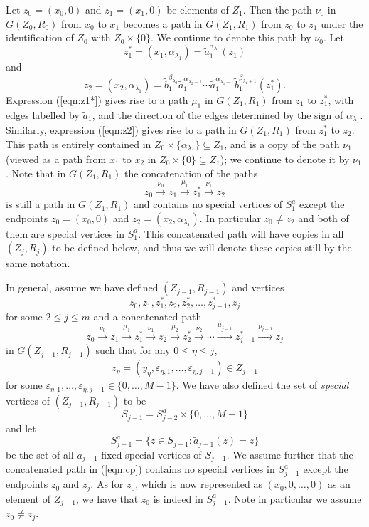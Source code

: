 \documentclass[10pt,a4paper]{amsart}
\theoremstyle{definition}
\theoremstyle{definition}
\numberwithin{equation}{section}
\begin{document}
Let $z_0=(x_0,0)$ and $z_1=(x_1,0)$ be elements of $Z_1$. Then the path $\nu_0$ in $G(Z_0,R_0)$ from $x_0$ to $x_1$ becomes a path in $G(Z_1, R_1)$ from $z_0$ to $z_1$ under the identification of $Z_0$ with $Z_0\times\{0\}$. We continue to denote this path by $\nu_0$. Let 
\begin{equation}\label{eqn:z1*} z_1^*=(x_1,\alpha_{\lambda_1})=\tilde{a}_1^{\alpha_{\lambda_1}}(z_1) \end{equation}
and
\begin{equation}\label{eqn:z2} z_2=(x_2, \alpha_{\lambda_1})=\tilde{b}_1^{\beta_{\lambda_2}}\tilde{a}_1^{\alpha_{\lambda_2-1}}\cdots\tilde{a}_1^{\alpha_{\lambda_1+1}}\tilde{b}_1^{\beta_{\lambda_1+1}}(z_1^*). \end{equation}
Expression (\ref{eqn:z1*}) gives rise to a path $\mu_1$ in $G(Z_1, R_1)$ from $z_1$ to $z_1^*$, with edges labelled by $\tilde{a}_1$, and the direction of the edges determined by the sign of $\alpha_{\lambda_1}$. Similarly, expression (\ref{eqn:z2}) gives rise to a path in $G(Z_1, R_1)$ from $z_1^*$ to $z_2$. This path is entirely contained in $Z_0\times \{\alpha_{\lambda_1}\}\subseteq Z_1$, and is a copy of the path $\nu_1$ (viewed as a path from $x_1$ to $x_2$ in $Z_0\times\{0\}\subseteq Z_1$); we continue to denote it by $\nu_1$. Note that in $G(Z_1, R_1)$ the concatenation of the paths
$$ z_0\stackrel{\nu_0}{\longrightarrow} z_1\stackrel{\mu_1}{\longrightarrow}z_1^*\stackrel{\nu_1}{\longrightarrow}z_2 $$
is still a path in $G(Z_1, R_1)$ and contains no special vertices of $S_1^a$ except the endpoints $z_0=(x_0, 0)$ and $z_2=(x_2, \alpha_{\lambda_1})$. In particular $z_0\neq z_2$ and both of them are special vertices in $S_1^a$. This concatenated path will have copies in all $(Z_j, R_j)$ to be defined below, and thus we will denote these copies still by the same notation.

In general, assume we have defined $(Z_{j-1}, R_{j-1})$ and vertices $$z_0, z_1, z_1^*, z_2, z_2^*, \dots, z_{j-1}^*, z_{j}$$ for some $2\leq j\leq m$ and a concatenated path
\begin{equation}\label{eqn:cp} z_0\stackrel{\nu_0}{\longrightarrow} z_1\stackrel{\mu_1}{\longrightarrow}z_1^*\stackrel{\nu_1}{\longrightarrow}z_2\stackrel{\mu_2}{\longrightarrow}{z_2^*}\stackrel{\nu_2}{\longrightarrow}\cdots\stackrel{\mu_{j-1}}{\longrightarrow}z_{j-1}^*\stackrel{\nu_{j-1}}{\longrightarrow}z_{j} 
\end{equation}
in $G(Z_{j-1}, R_{j-1})$ such that for any $0\leq \eta\leq j$, 
$$z_{\eta}=(y_\eta, \varepsilon_{\eta,1},\dots, \varepsilon_{\eta, j-1})\in Z_{j-1}$$ for some $\varepsilon_{\eta,1}, \dots, \varepsilon_{\eta, j-1}\in \{0,\dots, M-1\}$. We have also defined the set of {\em special} vertices of $(Z_{j-1}, R_{j-1})$ to be 
$$ S_{j-1}=S_{j-2}^a\times \{0, \dots, M-1\} $$
and let
$$ S_{j-1}^a=\{z\in S_{j-1}\colon \tilde{a}_{j-1}(z)=z\} $$
be the set of all $\tilde{a}_{j-1}$-fixed special vertices of $S_{j-1}$. We assume further that the concatenated path in (\ref{eqn:cp}) contains no special vertices in $S_{j-1}^a$ except the endpoints $z_0$ and $z_j$. As for $z_0$, which is now represented as $(x_0, 0,\dots, 0)$ as an element of $Z_{j-1}$, we have that $z_0$ is indeed in $S_{j-1}^a$. Note in particular we assume $z_0\neq z_j$.
\end{document}
